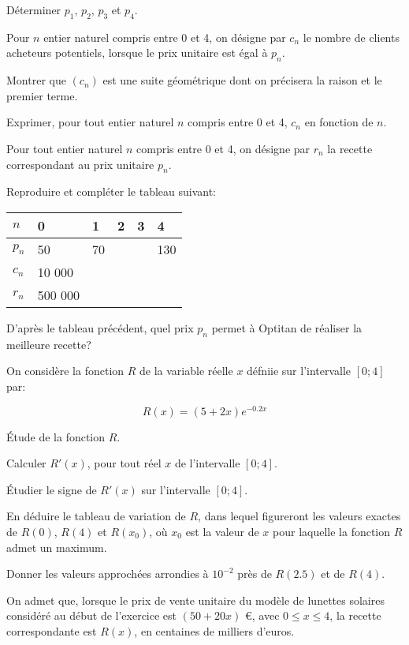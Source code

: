 \documentclass[a4paper,12pt]{scrartcl}
\begin{document}
Déterminer $p_1$, $p_2$, $p_3$ et $p_4$.

\question{}
Pour $n$ entier naturel compris entre 0 et 4, on désigne par $c_n$ le nombre de clients acheteurs potentiels, lorsque le prix unitaire est égal à $p_n$.

\subquestion{}
Montrer que $(c_n)$ est une suite géométrique dont on précisera la raison et le premier terme.

\subquestion{}
Exprimer, pour tout entier naturel $n$ compris entre 0 et 4, $c_n$ en fonction de $n$.

\question{}
Pour tout entier naturel $n$ compris entre 0 et 4, on désigne par $r_n$ la recette correspondant au prix unitaire $p_n$.

\subquestion{}
Reproduire et compléter le tableau suivant:

\begin{center}
\begin{tabular}{|l|l|l|l|l|l|}
\hline
$n$   & 0       & 1  & 2 & 3 & 4   \\ \hline
$p_n$ & 50      & 70 &   &   & 130 \\ \hline
$c_n$ & 10 000  &    &   &   &     \\ \hline
$r_n$ & 500 000 &    &   &   &     \\ \hline
\end{tabular}
\end{center}

\subquestion{}
D'après le tableau précédent, quel prix $p_n$ permet à Optitan de réaliser la meilleure recette?


On considère la fonction $R$ de la variable réelle $x$ défniie sur l'intervalle $\left[0 ; 4\right]$ par:

$$R(x) = (5+2x)e^{-0.2x}$$

\question{}
Étude de la fonction $R$.

\subquestion{}
Calculer $R'(x)$, pour tout réel $x$ de l'intervalle $[0;4]$. 

\subquestion{}
Étudier le signe de $R'(x)$ sur l'intervalle $[0;4]$. 

En déduire le tableau de variation de $R$, dans lequel figureront les valeurs exactes de $R(0)$, $R(4)$ et $R(x_0)$, où $x_0$ est la valeur de $x$ pour laquelle la fonction $R$ admet un maximum. 

\subquestion{}
Donner les valeurs approchées arrondies à $10^{-2}$ près de $R(2.5)$ et de $R(4)$.

\question{}
On admet que, lorsque le prix de vente unitaire du modèle de lunettes solaires considéré au début de l'exercice est $(50+20x)$ €, avec $0 \leqslant x \leqslant 4$, la recette correspondante est $R(x)$, en centaines de milliers d'euros.
\end{document}
